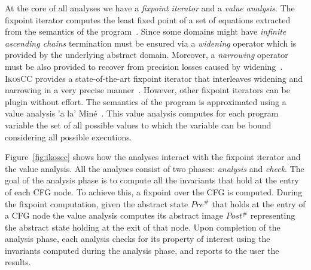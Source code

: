 \documentclass[a4]{article}
\newcommand{\ikoscc}{\textsc{IkosCC}\xspace}
\begin{document}
At the core of all analyses we have a \emph{fixpoint iterator} and a
\emph{value analysis}. The fixpoint iterator computes the least fixed
point of a set of equations extracted from the semantics of the
program~\cite{intervals,Cousot_POPL77}. Since some domains might have
\emph{infinite ascending chains} termination must be ensured via a
\emph{widening} operator which is provided by the underlying abstract
domain. Moreover, a \emph{narrowing} operator must be also provided to
recover from precision losses caused by
widening~\cite{Cousot_PLILP92}. \ikoscc provides a state-of-the-art
fixpoint iterator that interleaves widening and narrowing in a very
precise manner~\cite{amatoSAS13}. However, other fixpoint iterators
can be plugin without effort. The semantics of the program is
approximated using a value analysis 'a la'
Min\'{e}~\cite{Mine06}. This value analysis computes for each program
variable the set of all possible values to which the variable can be
bound considering all possible executions.

Figure~\ref{fig:ikoscc} shows how the analyses interact with the
fixpoint iterator and the value analysis. All the analyses consist of
two phases: \emph{analysis} and \emph{check}. The goal of the analysis
phase is to compute all the invariants that hold at the entry of each
CFG node. To achieve this, a fixpoint over the CFG is computed. During
the fixpoint computation, given the abstract state $Pre^{\#}$ that
holds at the entry of a CFG node the value analysis computes its
abstract image $Post^{\#}$ representing the abstract state holding at
the exit of that node. Upon completion of the analysis phase, each
analysis checks for its property of interest using the invariants
computed during the analysis phase, and reports to the user the
results.
\end{document}
